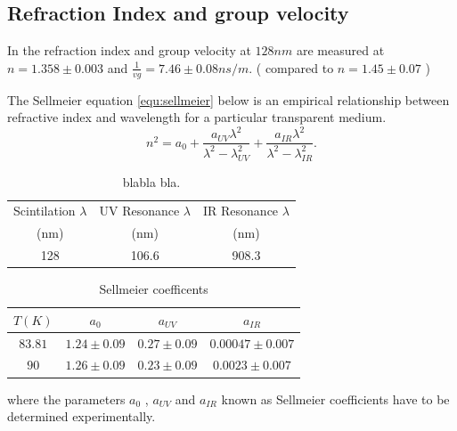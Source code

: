 \documentclass[a4paper]{jpconf}
\begin{document}
\subsection{Refraction Index and group velocity}

In \cite{ref:vg} the refraction index and group velocity  at $128 nm$ are measured at $n = 1.358 \pm 0.003$ and $\frac{1}{vg} = 7.46 \pm 0.08 ns/m$.
                            ( compared to $n= 1.45 \pm 0.07$ \cite{ref:grace})

The Sellmeier equation \ref{equ:sellmeier} below is an empirical relationship between refractive index and wavelength for a particular transparent medium.
\begin{equation}
n^2 = a_0 + \frac{a_{UV} \lambda^2}{\lambda^2 -\lambda^2_{UV}}+\frac{a_{IR}\lambda^2}{\lambda^2 - \lambda^2_{IR}}.
 \label{equ:sellmeier}
\end{equation}

 \begin{table}[h!]
  \begin{center}
    \label{tab:table1}
    \begin{tabular}{|c|c|c|} 
      \hline
       Scintilation $\lambda$ & UV Resonance $\lambda$ &IR Resonance $\lambda$\\
 (nm)           & (nm)          &(nm) \\
      \hline
128 & 106.6 &908.3\\
      \hline
    \end{tabular}
  \end{center}
  \caption{blabla bla.}
 \end{table}
 
 \begin{table}[h!]
  \begin{center}
    \label{tab:table1}
    \begin{tabular}{|c|c|c|c|} 
      \hline
 $T (K) $& $a_0$ & $a_{UV}$ & $a_{IR}$ \\
\hline
      $83.81$ & $1.24\pm0.09$ & $0.27\pm0.09$ & $0.00047\pm0.007$ \\
$90$ & $1.26\pm 0.09$& $0.23\pm 0.09$ & $0.0023\pm0.007$ \\
      \hline
    \end{tabular}
  \end{center}
  \caption{Sellmeier coefficents}
 \end{table}
 
where the parameters $a_0$ , $a_{UV}$ and $a_{IR}$ known as Sellmeier coefficients have to be determined
experimentally.
 
\end{document}
